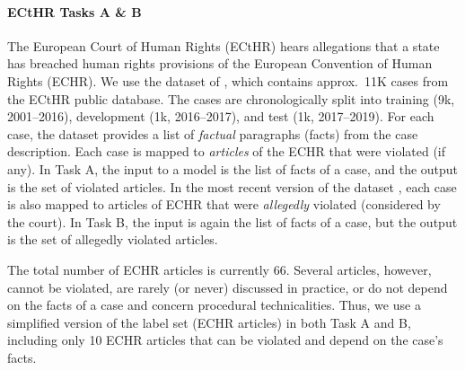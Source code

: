 \documentclass[11pt]{article}
\begin{document}
\paragraph{ECtHR Tasks A \& B} The European Court of Human Rights (ECtHR) hears allegations that a state has breached human rights provisions of the European Convention of Human Rights (ECHR). We use the dataset of \citet{chalkidis-etal-2019-neural, chalkidis-et-al-2021-ecthr}, which contains approx.\ 11K cases from the ECtHR public database. The cases are chronologically split into training (9k, 2001--2016), development (1k, 2016--2017), and test (1k, 2017--2019). For each case, the dataset provides a list of \emph{factual} paragraphs (facts) from the case description. Each case is mapped to \emph{articles} of the ECHR that were violated (if any). In Task A, the input to a model is the list of facts of a case, and the output is the set of violated articles. In the most recent version of the dataset \cite{chalkidis-et-al-2021-ecthr}, each case is also mapped to articles of ECHR that were \emph{allegedly} violated (considered by the court). In Task B, the input is again the list of facts of a case, but the output is the set of allegedly violated articles.

The total number of ECHR articles is currently 66.
Several articles, however,  cannot be violated, are rarely (or never) discussed in practice, or do not depend on the facts of a case and concern procedural technicalities. Thus, we use a simplified version of the label set (ECHR articles) in both Task A and B, including only 10 ECHR articles that can be violated and depend on the case's facts. 
\end{document}
